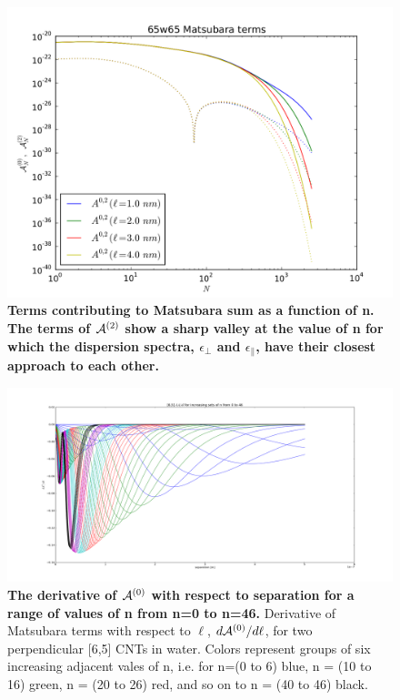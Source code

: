 \documentclass[a4paper]{article}
\begin{document}
\begin{center}
\begin{figure}[t!]
\begin{center}
\includegraphics[width=1.2\textwidth,scale= 0.7]{large_N/65_A_vs_lrg_n.png}
\hskip 43pt
\caption{\bf{Terms contributing to Matsubara sum as a function of n.}
    The terms of ${\cal A}^{(2)}$ show a sharp valley at the value of n for which the
dispersion spectra, $\epsilon_{\perp}$ and $\epsilon_{\parallel}$, have
their closest approach to each other.}
\label{eiz65}
\end{center}
\end{figure} 
\hskip 73pt
\begin{figure}[t!]
\begin{center}
\includegraphics[width=1.2\textwidth,scale= 0.5]{plots/65_0to46.png}
\hskip 43pt
\caption{{\bf{The derivative of ${\cal A}^{(0)}$ with respect to separation for a
        range of values of n from n=0 to n=46.}} Derivative of Matsubara terms with 
        respect to $\ell$, $d{\cal A}^{(0)}/d\ell$, for two perpendicular [6,5] CNTs in water. 
        Colors represent groups of six increasing adjacent vales of n, i.e. for n=(0 to 6) blue, 
        n = (10 to 16) green, n = (20 to 26) red, and so on to n = (40 to 46) black.}
\label{eiz65}
\end{center}
\end{figure} 


\end{center}
\end{document}
